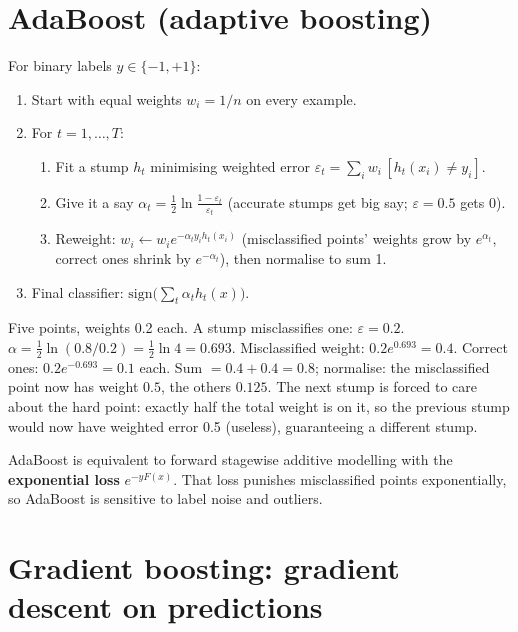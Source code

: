 \section{AdaBoost (adaptive boosting)}
For binary labels $y\in\{-1,+1\}$:
\begin{enumerate}
\item Start with equal weights $w_i = 1/n$ on every example.
\item For $t = 1,\dots,T$:
  \begin{enumerate}
  \item Fit a stump $h_t$ minimising weighted error $\varepsilon_t = \sum_i w_i\,[h_t(x_i)\ne y_i]$.
  \item Give it a say $\alpha_t = \frac12\ln\frac{1-\varepsilon_t}{\varepsilon_t}$ (accurate stumps get big say; $\varepsilon = 0.5$ gets 0).
  \item Reweight: $w_i \leftarrow w_i e^{-\alpha_ty_ih_t(x_i)}$ (misclassified points' weights grow by $e^{\alpha_t}$, correct ones
    shrink by $e^{-\alpha_t}$), then normalise to sum 1.
  \end{enumerate}
\item Final classifier: $\text{sign}\big(\sum_t\alpha_th_t(x)\big)$.
\end{enumerate}
\begin{example}
Five points, weights 0.2 each. A stump misclassifies one: $\varepsilon = 0.2$. $\alpha = \frac12\ln(0.8/0.2) = \frac12\ln4 = 0.693$.
Misclassified weight: $0.2e^{0.693} = 0.4$. Correct ones: $0.2e^{-0.693} = 0.1$ each. Sum $= 0.4 + 0.4 = 0.8$; normalise: the
misclassified point now has weight $0.5$, the others $0.125$. The next stump is forced to care about the hard point: exactly half
the total weight is on it, so the previous stump would now have weighted error 0.5 (useless), guaranteeing a different stump.
\end{example}
AdaBoost is equivalent to forward stagewise additive modelling with the \textbf{exponential loss} $e^{-yF(x)}$. That loss punishes
misclassified points exponentially, so AdaBoost is sensitive to label noise and outliers.

\section{Gradient boosting: gradient descent on predictions}

